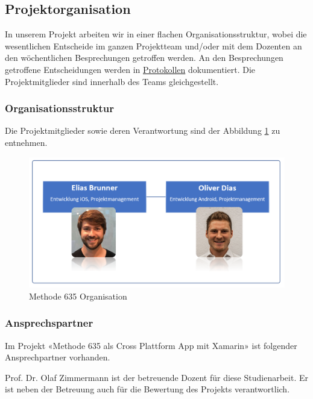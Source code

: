 \subsection{Projektorganisation}
In unserem Projekt arbeiten wir in einer flachen Organisationsstruktur, wobei die wesentlichen Entscheide im ganzen Projektteam und/oder mit dem Dozenten an den wöchentlichen Besprechungen getroffen werden. An den Besprechungen getroffene Entscheidungen werden in \href{https://github.com/BrainingOutOfBox/Doc/wiki} {Protokollen} dokumentiert. Die Projektmitglieder sind innerhalb des Teams gleichgestellt.

\subsubsection*{Organisationsstruktur}
Die Projektmitglieder sowie deren Verantwortung sind der Abbildung \ref{fig:organisation} zu entnehmen.
\begin{figure}[h]
	\centering
	\includegraphics[width=1\linewidth]{img/projekt-plan/organisation}
	\caption[Organisation Methode 635]{Methode 635 Organisation}
	\label{fig:organisation}
\end{figure}

\subsubsection*{Ansprechspartner}
Im Projekt «Methode 635 als Cross Plattform App mit Xamarin» ist folgender Ansprechpartner vorhanden.

\begin{description}[leftmargin=!,labelwidth=\widthof{\bfseries Betreuer}]
	\item[Betreuer] Prof. Dr. Olaf Zimmermann ist der betreuende Dozent für diese Studienarbeit. Er ist neben der Betreuung auch für die Bewertung des Projekts verantwortlich. 
\end{description}

